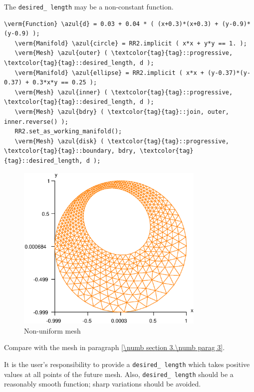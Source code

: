 The {\small\tt desired\_\,length} may be a non-constant function.

\begin{Verbatim}[commandchars=\\\{\},formatcom=\small\tt,frame=single,
   label=parag-\ref{\numb section 3.\numb parag 22}.cpp,rulecolor=\color{coment},
   baselinestretch=0.94,framesep=2mm                                            ]
   \verm{Function} \azul{d} = 0.03 + 0.04 * ( (x+0.3)*(x+0.3) + (y-0.9)*(y-0.9) );
   \verm{Manifold} \azul{circle} = RR2.implicit ( x*x + y*y == 1. );
   \verm{Mesh} \azul{outer} ( \textcolor{tag}{tag}::progressive, \textcolor{tag}{tag}::desired_length, d );
   \verm{Manifold} \azul{ellipse} = RR2.implicit ( x*x + (y-0.37)*(y-0.37) + 0.3*x*y == 0.25 );
   \verm{Mesh} \azul{inner} ( \textcolor{tag}{tag}::progressive, \textcolor{tag}{tag}::desired_length, d );
   \verm{Mesh} \azul{bdry} ( \textcolor{tag}{tag}::join, outer, inner.reverse() );
   RR2.set_as_working_manifold();
   \verm{Mesh} \azul{disk} ( \textcolor{tag}{tag}::progressive, \textcolor{tag}{tag}::boundary, bdry, \textcolor{tag}{tag}::desired_length, d );
\end{Verbatim}

\begin{figure}[ht] \centering
 \includegraphics[width=90mm]{disk-non-unif}
  \caption{Non-uniform mesh}
  \label{\numb section 3.\numb fig 10}
\end{figure}

Compare with the mesh in paragraph \ref{\numb section 3.\numb parag 3}.

It is the user's responsibility to provide a {\small\tt desired\_\,length} which takes positive
values at all points of the future mesh.
Also, {\small\tt desired\_\,length} should be a reasonably smooth function;
sharp variations should be avoided.


